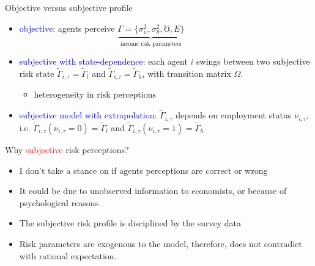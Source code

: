 \documentclass{beamer}
\begin{document}
\begin{frame}{Objective  versus subjective profile}
	\begin{itemize}
		\item \textcolor{blue}{objective}: agents perceive $\underbrace{\Gamma =\{\sigma^2_\psi,\sigma^2_\theta,\mho,E\}}_{\text{income risk parameters}}$ 
			\item \textcolor{blue}{subjective with state-dependence}: each agent $i$ swings between two  subjective risk state  $\tilde \Gamma_{i,\tau} = \tilde \Gamma_l$ and $\tilde \Gamma_{i,\tau} = \tilde \Gamma_h$, with transition matrix $\Omega$. 
			\begin{itemize}
				\item heterogeneity in risk perceptions 
			\end{itemize}
			\item \textcolor{blue}{subjective model with extrapolation}:  $\tilde \Gamma_{i,\tau}$ depends on employment status $\nu_{i,\tau}$, i.e. $\tilde \Gamma_{i,\tau}(\nu_{i,\tau}=0) = \tilde \Gamma_l$ and $\tilde \Gamma_{i,\tau}(\nu_{i,\tau}=1) = \tilde \Gamma_h$
	\end{itemize}
\end{frame}


\begin{frame}{Why \textcolor{red}{subjective} risk perceptions?}
	\begin{itemize}
		\item I don't take a stance on if agents perceptions are correct or wrong
		\item It could be due to unobserved information to economists, or because of psychological reasons
		\item The subjective risk profile is disciplined by the survey data 
		\item Risk parameters are exogenous to the model, therefore, does not contradict with rational expectation. 
	\end{itemize}
\end{frame}
\end{document}
